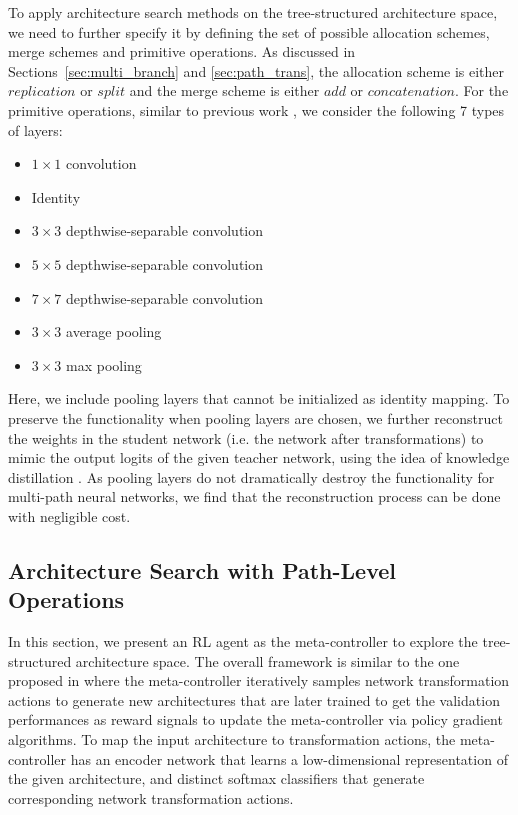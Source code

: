 \documentclass{article}
\begin{document}
To apply architecture search methods on the tree-structured architecture space, we need to further specify it by defining the set of possible allocation schemes, merge schemes and primitive operations. As discussed in Sections~\ref{sec:multi_branch} and \ref{sec:path_trans}, the allocation scheme is either $replication$ or $split$ and the merge scheme is either $add$ or $concatenation$. For the primitive operations, similar to previous work \cite{zoph2017learning,liu2017hierarchical}, we consider the following 7 types of layers:
{\small
\begin{itemize}
	\setlength\itemsep{0.pt}
	\item $1 \times 1$ convolution
	\item Identity
	\item $3 \times 3$ depthwise-separable convolution 
	\item $5 \times 5$ depthwise-separable convolution
	\item $7 \times 7$ depthwise-separable convolution
    \item $3 \times 3$ average pooling
    \item $3 \times 3$ max pooling
\end{itemize}
}
Here, we include pooling layers that cannot be initialized as identity mapping. To preserve the functionality when pooling layers are chosen, we further reconstruct the weights in the student network (i.e. the network after transformations) to mimic the output logits of the given teacher network, using the idea of knowledge distillation \cite{hinton2015distilling}. As pooling layers do not dramatically destroy the functionality for multi-path neural networks, we find that the reconstruction process can be done with negligible cost. 

\subsection{Architecture Search with Path-Level Operations}\label{sec:arch_search_method}
In this section, we present an RL agent as the meta-controller to explore the tree-structured architecture space. The overall framework is similar to the one proposed in \citet{cai2018efficient} where the meta-controller iteratively samples network transformation actions to generate new architectures that are later trained to get the validation performances as reward signals to update the meta-controller via policy gradient algorithms.
To map the input architecture to transformation actions, the meta-controller has an encoder network that learns a low-dimensional representation of the given architecture, and distinct softmax classifiers that generate corresponding network transformation actions. 
\end{document}

